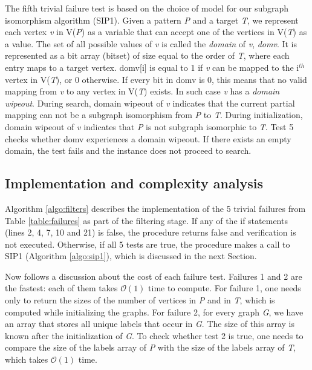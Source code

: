 \documentclass{l4proj}
\begin{document}
The fifth trivial failure test is based on the choice of model for our subgraph isomorphism algorithm (SIP1). Given a pattern \emph{P} and a target \emph{T}, we represent each vertex \emph{v} in V(\emph{P}) as a variable that can accept one of the vertices in V(\emph{T}) as a value. The set of all possible values of \emph{v} is called the \emph{domain} of \emph{v}, \emph{domv}. It is represented as a bit array (bitset) of size equal to the order of \emph{T}, where each entry maps to a target vertex. domv[i] is equal to 1 if \emph{v} can be mapped to the i$^{th}$ vertex in V(\emph{T}), or 0 otherwise. If every bit in domv is 0, this means that no valid mapping from \emph{v} to any vertex in V(\emph{T}) exists. In such case \emph{v} has a \emph{domain wipeout}. During search, domain wipeout of \emph{v} indicates that the current partial mapping can not be a subgraph isomorphism from \emph{P} to \emph{T}. During initialization, domain wipeout of \emph{v} indicates that \emph{P} is not subgraph isomorphic to \emph{T}. Test 5 checks whether domv experiences a domain wipeout. If there exists an empty domain, the test fails and the instance does not proceed to search.

\subsection{Implementation and complexity analysis}
\label{sec:trivialFailsImplementation}
Algorithm \ref{algo:filters} describes the implementation of the 5 trivial failures from Table \ref{table:failures} as part of the filtering stage. If any of the if statements (lines 2, 4, 7, 10 and 21) is false, the procedure returns false and verification is not executed. Otherwise, if all 5 tests are true, the procedure makes a call to SIP1 (Algorithm \ref{algo:sip1}), which is discussed in the next Section.

Now follows a discussion about the cost of each failure test.
Failures 1 and 2 are the fastest: each of them takes $\mathcal{O}(1)$ time to compute. For failure 1, one needs only to return the sizes of the number of vertices in \emph{P} and in \emph{T}, which is computed while initializing the graphs. For failure 2, for every graph \emph{G}, we have an array that stores all unique labels that occur in \emph{G}. The size of this array is known after the initialization of \emph{G}. To check whether test 2 is true, one needs to compare the size of the labels array of \emph{P} with the size of the labels array of \emph{T},  which takes $\mathcal{O}(1)$ time.
\end{document}
